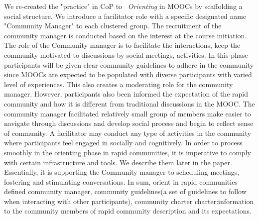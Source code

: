 \documentclass[manuscript,screen,review]{acmart}
\begin{document}
We re-created the "practice" in CoP to ~\textit{Orienting} in MOOCs by scaffolding a social structure. We introduce a facilitator role with a specific designated name "Community Manager" to each clustered group. The recruitment of the community manager is conducted based on the interest at the course initiation. The role of the Community manager is to facilitate the interactions, keep the community motivated to discussions by social meetings, activities. In this phase participants will be given clear community guidelines to adhere in the community since MOOCs are expected to be populated with diverse participants with varied level of experiences. This also creates a moderating role for the community manager. However, participants also been informed the expectation of the rapid community and how it is different from traditional discussions in the MOOC. The community manager facilitated relatively small group of members make easier to navigate through discussions and develop social process and begin to reflect sense of community. A facilitator may conduct any type of activities in the community where participants feel engaged in socially and cognitively. In order to process smoothly in the orienting phase in rapid communities, it is imperative to comply with certain infrastructure and tools. We describe them later in the paper. Essentially, it is supporting the Community manager to scheduling meetings, fostering and stimulating conversations. In sum, orient in rapid communities defined community manager, community guidelines(a set of guidelines to follow when interacting with other participants), community charter charter:information to the community members of rapid community description and its expectations.
\end{document}
